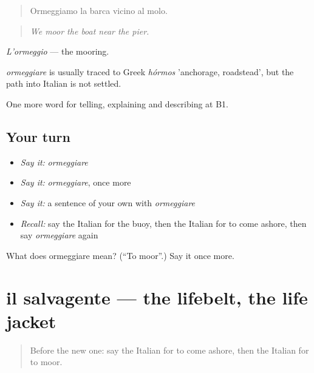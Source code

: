 \begin{quote}
Ormeggiamo la barca vicino al molo.
\end{quote}

\begin{quote}
\emph{We moor the boat near the pier.}
\end{quote}

\emph{L'ormeggio} — the mooring.

\begin{cousinweb}
\emph{ormeggiare} is usually traced to Greek \emph{hórmos} 'anchorage, roadstead', but the path into Italian is not settled.
\end{cousinweb}

\begin{grammarlens}[title={What you've built}]
One more word for telling, explaining and describing at B1.
\end{grammarlens}

\subsection*{Your turn}
\begin{itemize}
\raggedright
  \item \emph{Say it:} \emph{ormeggiare}
  \item \emph{Say it:} \emph{ormeggiare}, once more
  \item \emph{Say it:} a sentence of your own with \emph{ormeggiare}
  \item \emph{Recall:} say the Italian for the buoy, then the Italian for to come ashore, then say \emph{ormeggiare} again
\end{itemize}

\begin{tcolorbox}[breakable,colback=teal!4,colframe=teal!35!black,title={Before you move on}]
What does ormeggiare mean? (\textquotedblleft{}To moor\textquotedblright{}.) Say it once more.
\end{tcolorbox}
\section[il salvagente]{il salvagente — the lifebelt, the life jacket}

\label{lesson:IT-C424-salvagente}



\begin{quote}
Before the new one: say the Italian for to come ashore, then the Italian for to moor.
\end{quote}

